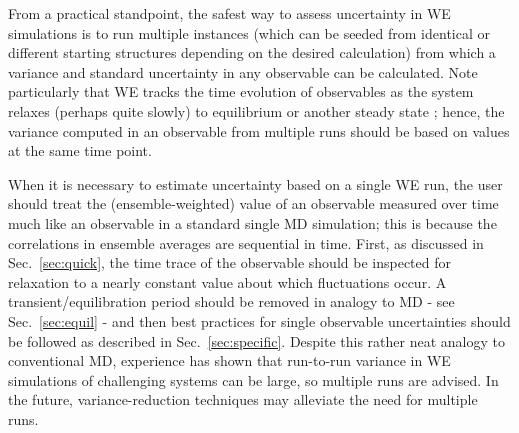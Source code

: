 From a practical standpoint, the safest way to assess uncertainty in WE simulations is to run multiple instances (which can be seeded from identical or different starting structures depending on the desired calculation) from which a variance and standard uncertainty in any observable can be calculated.
Note particularly that WE tracks the time evolution of observables as the system relaxes (perhaps quite slowly) to equilibrium or another steady state \cite{Zhang2010a}; hence, the variance computed in an observable from multiple runs should be based on values at the same time point.

When it is necessary to estimate uncertainty based on a single WE run, the user should treat the (ensemble-weighted) value of an observable measured over time much like an observable in a standard single MD simulation; this is because the correlations in ensemble averages are sequential in time.
First, as discussed in Sec.\ \ref{sec:quick}, the time trace of the observable should be inspected for relaxation to a nearly constant value about which fluctuations occur.
A transient/equilibration period should be removed in analogy to MD - see Sec.\ \ref{sec:equil} - and then best practices for single observable uncertainties should be followed as described in Sec.\ \ref{sec:specific}.
Despite this rather neat analogy to conventional MD, experience has shown that run-to-run variance in WE simulations of challenging systems can be  large, so multiple runs are  advised.  In the future, variance-reduction techniques may alleviate the need for multiple runs.
